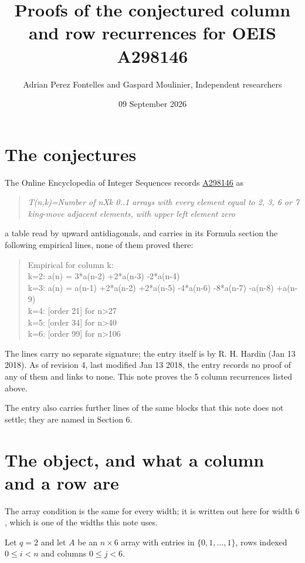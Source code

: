 \documentclass[11pt]{article}
\title{Proofs of the conjectured column and row recurrences for OEIS A298146}
\author{Adrian Perez Fontelles and Gaspard Moulinier, Independent researchers}
\date{09 September 2026}
\theoremstyle{definition}
\begin{document}
\maketitle
\section{The conjectures}

The Online Encyclopedia of Integer Sequences records \href{https://oeis.org/A298146}{A298146} as

\begin{quote}\itshape T(n,k)=Number of nXk 0..1 arrays with every element equal to 2, 3, 6 or 7 king-move adjacent elements, with upper left element zero\end{quote}

a table read by upward antidiagonals, and carries in its Formula section the following empirical lines, none of them proved there:

\begin{quote}\ttfamily Empirical for column k:\\
k=2: a(n) = 3*a(n-2) +2*a(n-3) -2*a(n-4)\\k=3: a(n) = a(n-1) +2*a(n-2) +2*a(n-5) -4*a(n-6) -8*a(n-7) -a(n-8) +a(n-9)\\k=4: [order 21] for n>27\\k=5: [order 34] for n>40\\k=6: [order 99] for n>106\end{quote}

The lines carry no separate signature; the entry itself is by R. H. Hardin (Jan 13 2018). As of revision 4, last modified Jan 13 2018, the entry records no proof of any of them and links to none. This note proves the 5 column recurrences listed above.

The entry also carries further lines of the same blocks that this note does not settle; they are named in Section 6.

\section{The object, and what a column and a row are}

The array condition is the same for every width; it is written out here for width $6$, which is one of the widths this note uses.

Let $q = 2$ and let $A$ be an $n \times 6$ array with entries in $\{0,1,\dots,1\}$, rows indexed $0 \le i < n$ and columns $0 \le j < 6$.
\end{document}
